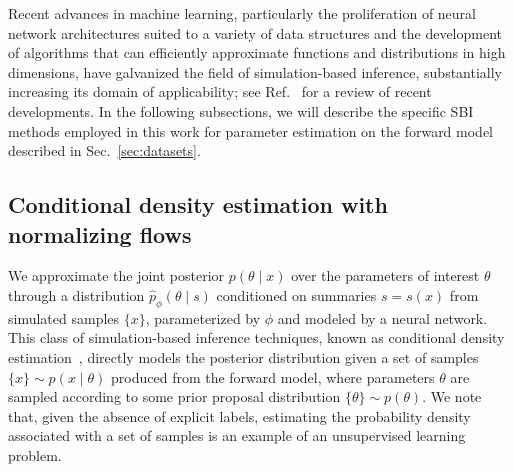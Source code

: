 \documentclass[prd,aps,10pt,nofootinbib,twocolumn,superscriptaddress,preprintnumbers,balancelastpage,longbibliography]{revtex4-1}
\begin{document}
Recent advances in machine learning, particularly the proliferation of neural network architectures suited to a variety of data structures and the development of algorithms that can efficiently approximate functions and distributions in high dimensions, have galvanized the field of simulation-based inference, substantially increasing its domain of applicability; see Ref.~\cite{cranmer2020frontier} for a review of recent developments. In the following subsections, we will describe the specific SBI methods employed in this work for parameter estimation on the forward model described in Sec.~\ref{sec:datasets}.


\subsection{Conditional density estimation with normalizing flows}

We approximate the joint posterior $p(\theta\mid x)$ over the parameters of interest $\theta$ through a distribution $\hat p_\phi(\theta\mid s)$ conditioned on summaries $s=s(x)$ from simulated samples $\{x\}$, parameterized by $\phi$ and modeled by a neural network. This class of simulation-based inference techniques, known as conditional density estimation~\cite{papamakariosFastEpsilonFree2018}, directly models the posterior distribution given a set of samples $\{x\}\sim p(x\mid\theta)$ produced from the forward model, where parameters $\theta$ are sampled according to some prior proposal distribution $\{\theta\}\sim p(\theta)$. We note that, given the absence of explicit labels, estimating the probability density associated with a set of samples is an example of an unsupervised learning problem. \\
\end{document}
